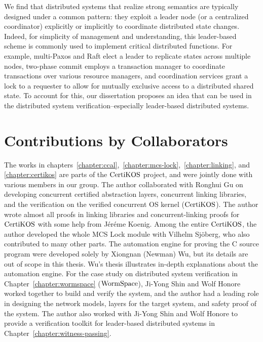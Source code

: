 We find that distributed systems that realize strong semantics are typically designed under a common pattern: 
they exploit a leader node (or a centralized coordinator) explicitly or implicitly to coordinate distributed state changes. Indeed, 
for simplicity of management and understanding, this leader-based scheme is commonly used to implement critical distributed functions. 
For example, multi-Paxos and Raft elect a leader to replicate states across multiple nodes, two-phase commit employs a transaction manager to
 coordinate transactions over various resource managers, and coordination services grant a lock to a requester to allow for mutually exclusive 
 access to a distributed shared state. 
 To account for this, our dissertation proposes an idea that can be used in the distributed system 
 verification--especially leader-based distributed systems.

\section{Contributions by Collaborators}
\label{chapter:introduction:sec:contributions-by-collaborators}

The works in chapters~\ref{chapter:ccal},~\ref{chapter:mcs-lock},~\ref{chapter:linking}, and \ref{chapter:certikos} are parts of 
the $\mathrm{CertiKOS}$ project, and were jointly done with various members in our group.
The author collaborated with Ronghui Gu on developing concurrent certified abstraction layers, concurrent linking libraries, and the verification on the verified concurrent OS kernel ($\mathrm{CertiKOS}$).  
The author wrote almost all proofs in linking libraries and concurrent-linking proofs for $\mathrm{CertiKOS}$ with some help from 
J{\'e}r{\'e}me Koenig.
Among the entire $\mathrm{CertiKOS}$, 
the author developed the whole MCS Lock module with Vilhelm Sj{\"o}berg,
who also contributed to many other parts. The automation engine for proving the C source program were developed solely by Xiongnan (Newman) Wu,
 but its details are out of scope in this thesis. Wu’s thesis illustrates in-depth explanations about the automation engine. 
 For the case study on distributed system verification in Chapter~\ref{chapter:wormspace} ($\mathrm{WormSpace}$), Ji-Yong Shin and Wolf Honore 
 worked together to build and verify the system, and the author had a leading role in designing the network models, 
 layers for the target system, and safety proof of the system.
 The author also worked with Ji-Yong Shin and Wolf Honore to provide a verification toolkit for leader-based distributed systems 
 in Chapter~\ref{chapter:witness-passing}.

